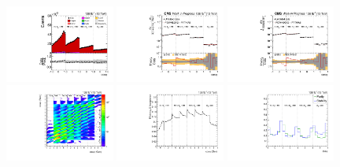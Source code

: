 \begin{refsection}
\begin{figure}[htb]
\end{figure}
\clearpage
\begin{figure}[htb]
\begin{center}
 \includegraphics[width=0.32\textwidth]{fig_fullRun2UL/controlplots/combined/Hyp_LLBarcHel_vs_TTBarMass.pdf}
 \includegraphics[width=0.32\textwidth]{fig_fullRun2UL/unfolding/combined/UnfoldedResults_ll_cHel_mttbar.pdf}
 \includegraphics[width=0.32\textwidth]{fig_fullRun2UL/unfolding/combined/UnfoldedResultsNorm_ll_cHel_mttbar.pdf} \\
 \includegraphics[width=0.32\textwidth]{fig_fullRun2UL/unfolding/combined/ResponseMatrix_ll_cHel_mttbar.pdf}
 \includegraphics[width=0.32\textwidth]{fig_fullRun2UL/unfolding/combined/TotEff_ll_cHel_mttbar.pdf}
 \includegraphics[width=0.32\textwidth]{fig_fullRun2UL/unfolding/combined/PurStab_ll_cHel_mttbar.pdf} \\

\end{center}
\end{figure}
\end{refsection}
